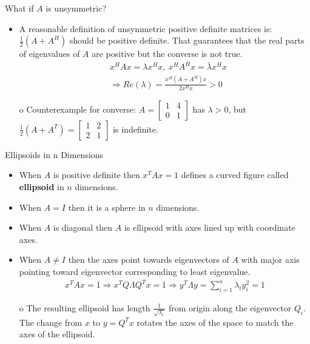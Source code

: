 \documentclass{beamer}
\begin{document}
\begin{frame}{What if $A$ is unsymmetric?}{}
\begin{itemize}
    \item {A reasonable definition of unsymmetric positive definite matrices is: $\frac{1}{2}(A+A^H)$ should be positive definite. That guarantees that the real parts of eigenvalues of $A$ are positive but the converse is not true.
        \begin{align*}
            &x^HAx = \lambda x^Hx, \ x^HA^Hx = \bar{\lambda}x^Hx \\
            &\Rightarrow Re(\lambda) = \frac{x^H(A+A^H)x}{2x^Hx} > 0
        \end{align*}
    }
    \item[o] Counterexample for converse: $A = \begin{bmatrix}1&4\\0&1\end{bmatrix}$ has $\lambda > 0$, but $\frac{1}{2}(A+A^T) = \begin{bmatrix}1&2\\2&1\end{bmatrix}$ is indefinite.
\end{itemize}
\end{frame}

\begin{frame}{Ellipsoids in n Dimensions}{}
\begin{itemize}
    \item When $A$ is positive definite then $x^TAx = 1$ defines a curved figure called \textbf{ellipsoid} in $n$ dimensions.
    \item When $A=I$ then it is a sphere in $n$ dimensions.
    \item When $A$ is diagonal then $A$ is ellipsoid with axes lined up with coordinate axes.
    \item When $A\neq I$ then the axes point towards eigenvectors of $A$ with major axis pointing toward eigenvector corresponding to least eigenvalue.
    \begin{align*}
        x^TAx = 1 \Rightarrow x^TQ\Lambda Q^Tx = 1 \Rightarrow y^T\Lambda y = \sum_{i=1}^{n}\lambda_iy_i^2 = 1
    \end{align*}
    \item[o] The resulting ellipsoid has length $\frac{1}{\sqrt{\lambda_i}}$ from origin along the eigenvector $Q_i$. The change from $x$ to $y=Q^Tx$ rotates the axes of the space to match the axes of the ellipsoid.
\end{itemize}
\end{frame}
\end{document}
